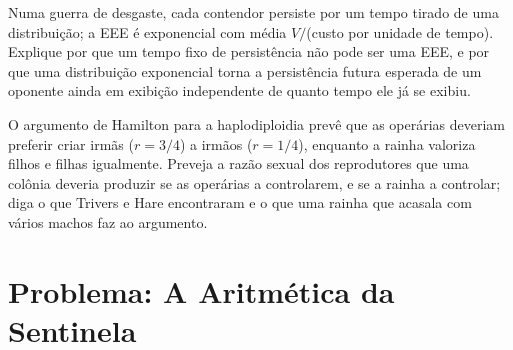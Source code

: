 \begin{exercise}[$\star\star\star$]\label{exo:b3:behavioural-ecology:11}
Numa guerra de desgaste, cada contendor persiste por um tempo tirado de
uma distribuição; a EEE é exponencial com média $V/$(custo por unidade de
tempo). Explique por que um tempo fixo de persistência não pode ser uma
EEE, e por que uma distribuição exponencial torna a persistência futura
esperada de um oponente ainda em exibição independente de quanto tempo
ele já se exibiu.
\end{exercise}

\begin{exercise}[$\star\star\star$]\label{exo:b3:behavioural-ecology:12}
O argumento de Hamilton para a haplodiploidia prevê que as operárias
deveriam preferir criar irmãs ($r = 3/4$) a irmãos ($r = 1/4$), enquanto
a rainha valoriza filhos e filhas igualmente. Preveja a razão sexual dos
reprodutores que uma colônia deveria produzir se as operárias a
controlarem, e se a rainha a controlar; diga o que Trivers e Hare
encontraram e o que uma rainha que acasala com vários machos faz ao
argumento.
\end{exercise}

\section{Problema: A Aritmética da Sentinela}

